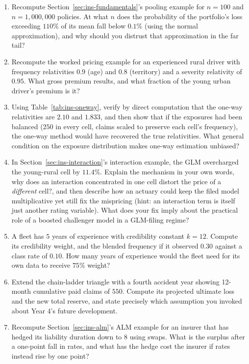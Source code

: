 \documentclass[../ai_in_finance]{subfiles}
\begin{document}
\begin{enumerate}
\item Recompute Section~\ref{sec:ins-fundamentals}'s pooling example for $n = 100$ and $n = 1{,}000{,}000$ policies. At what $n$ does the probability of the portfolio's loss exceeding $110\%$ of its mean fall below $0.1\%$ (using the normal approximation), and why should you distrust that approximation in the far tail?
\item Recompute the worked pricing example for an experienced rural driver with frequency relativities $0.9$ (age) and $0.8$ (territory) and a severity relativity of $0.95$. What gross premium results, and what fraction of the young urban driver's premium is it?
\item Using Table~\ref{tab:ins-oneway}, verify by direct computation that the one-way relativities are $2.10$ and $1.833$, and then show that if the exposures had been balanced ($250$ in every cell, claims scaled to preserve each cell's frequency), the one-way method would have recovered the true relativities. What general condition on the exposure distribution makes one-way estimation unbiased?
\item In Section~\ref{sec:ins-interaction}'s interaction example, the GLM overcharged the young-rural cell by $11.4\%$. Explain the mechanism in your own words, why does an interaction concentrated in one cell distort the price of a \emph{different} cell?, and then describe how an actuary could keep the filed model multiplicative yet still fix the mispricing (hint: an interaction term is itself just another rating variable). What does your fix imply about the practical role of a boosted challenger model in a GLM-filing regime?
\item A fleet has $5$ years of experience with credibility constant $k = 12$. Compute its credibility weight, and the blended frequency if it observed $0.30$ against a class rate of $0.10$. How many years of experience would the fleet need for its own data to receive $75\%$ weight?
\item Extend the chain-ladder triangle with a fourth accident year showing 12-month cumulative paid claims of $550$. Compute its projected ultimate loss and the new total reserve, and state precisely which assumption you invoked about Year 4's future development.
\item Recompute Section~\ref{sec:ins-alm}'s ALM example for an insurer that has hedged its liability duration down to $8$ using swaps. What is the surplus after a one-point fall in rates, and what has the hedge cost the insurer if rates instead rise by one point?

\end{enumerate}
\end{document}
